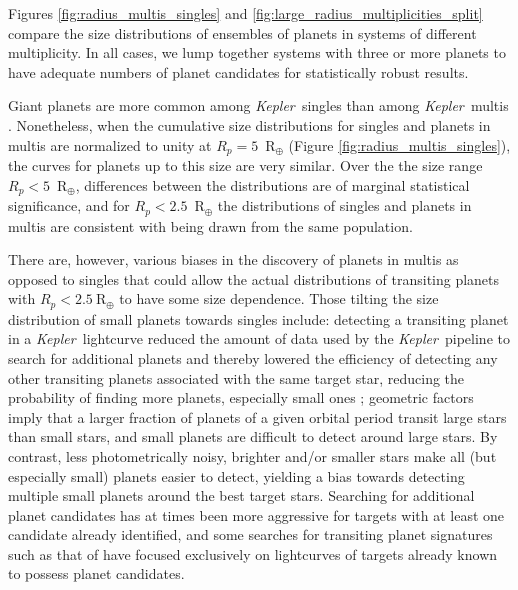 \documentclass{aastex62}
\newcommand{\ik}{{\it Kepler~}}
\begin{document}
Figures \ref{fig:radius_multis_singles} and \ref{fig:large_radius_multiplicities_split} compare the size distributions of ensembles of planets in systems of different multiplicity.  In all cases, we lump together systems with three or more planets to have adequate numbers of planet candidates for statistically robust results. 

Giant planets are more common among \ik singles than among \ik multis  \citep{Latham:2011}. Nonetheless, when the cumulative size distributions for singles and planets in multis are normalized to unity at $R_p = 5$~R$_\oplus$ (Figure \ref{fig:radius_multis_singles}), the curves for planets up to this size are very similar{. Over the the size range $R_p < 5$~R$_\oplus$,   differences between the distributions are of  marginal statistical significance, and for $R_p < 2.5$~R$_\oplus$ the distributions of singles and planets in multis are consistent with being drawn from the same population.}%

There are, however, various biases in the discovery of planets in multis as opposed to singles that could allow the actual distributions of transiting planets with $R_p < 2.5~$R$_\oplus$ to have some size dependence. Those tilting the size distribution of small planets towards singles include: detecting  a transiting planet in a \ik lightcurve reduced the amount of data used by the \ik pipeline to search for additional planets and thereby lowered the efficiency of detecting any other transiting planets associated with the same target star, reducing the probability of finding more planets, especially small ones \citep{Zink:2019}; geometric factors imply that a larger fraction of planets of a given orbital period transit large stars than small stars, and small planets are difficult to detect around large stars. By contrast, less photometrically noisy, brighter and/or smaller stars make all (but especially small) planets easier to detect, yielding a bias towards detecting multiple small planets around the best target stars.  Searching for additional planet candidates has at times been more aggressive for targets with at least one candidate already identified, and some searches for transiting planet signatures such as that of \citet{Shallue:2018} have focused exclusively on lightcurves of targets already known to possess planet candidates.
\end{document}
